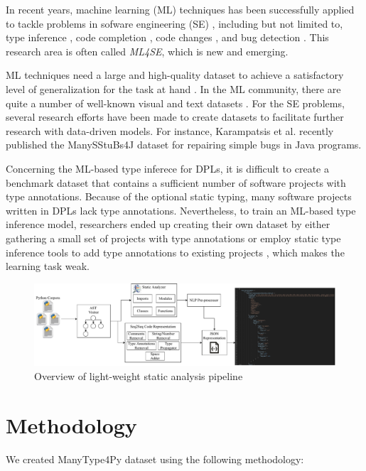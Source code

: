 \documentclass[10pt, conference]{IEEEtran}
\begin{document}
In recent years, machine learning (ML) techniques has been successfully applied to tackle problems in sofware engineering (SE) \cite{allamanis2018survey}, including but not limited to, type inference \cite{allamanis2020typilus, pradel2019typewriter}, code completion \cite{svyatkovskiy2019pythia}, code changes \cite{tufano2019learning}, and bug detection \cite{qiao2020deep}. This research area is often called \textit{ML4SE}, which is new and emerging.

ML techniques need a large and high-quality dataset to achieve a satisfactory level of generalization for the task at hand \cite{sun2017revisiting}. In the ML community, there are quite a number of well-known visual and text datasets \cite{pouyanfar2018survey}. For the SE problems, several research efforts have been made to create datasets to facilitate further research with data-driven models. For instance, Karampatsis et al. \cite{karampatsis2020often} recently published the ManySStuBs4J dataset for repairing simple bugs in Java programs. 

Concerning the ML-based type inferece for DPLs, it is difficult to create a benchmark dataset that contains a sufficient number of software projects with type annotations. Because of the optional static typing, many software projects written in DPLs lack type annotations. Nevertheless, to train an ML-based type inference model, researchers ended up creating their own dataset by either gathering a small set of projects with type annotations \cite{pradel2019typewriter} or employ static type inference tools to add type annotations to existing projects \cite{allamanis2020typilus}, which makes the learning task weak.



\begin{figure}[!t]
	\centering
	\includegraphics[width=\linewidth]{figs/manytypes4py-pipeline.pdf}
	\caption{Overview of light-weight static analysis pipeline}
	\label{fig:overview-pipeline-sa}
\end{figure}

\section{Methodology}
We created ManyType4Py dataset using the following methodology:
\end{document}
